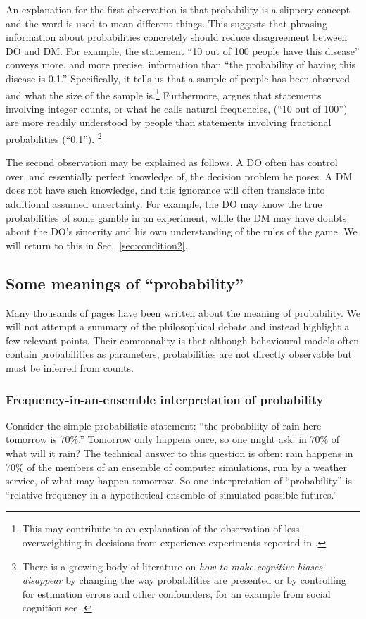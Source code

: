 \documentclass[a4paper, 12pt]{article}
\newcommand{\seclabel}[1]{\label{sec:#1}}
\newcommand{\secref}[1]{Sec.~\ref{sec:#1}}
\begin{document}
An explanation for the first observation is that probability is a slippery concept and the word is used to mean different things. This suggests that phrasing information about probabilities concretely should reduce disagreement between DO and DM. For example, the statement ``10 out of 100 people have this disease'' conveys more, and more precise, information than ``the probability of having this disease is 0.1.'' Specifically, it tells us that a sample of people has been observed and what the size of the sample is.\footnote{This may contribute to an explanation of the observation of less overweighting in decisions-from-experience experiments reported in \textcite{HertwigETAL2004,HertwigErev2009}.} Furthermore, \textcite{Gigerenzer2018} argues that statements involving integer counts, or what he calls natural frequencies,  (``10 out of 100'') are more readily understood by people than statements involving fractional probabilities (``0.1'').%
\footnote{There is a growing body of literature on \textit{how to make cognitive biases disappear} by changing the way probabilities are presented \parencite{Gigerenzer1991} or by controlling for estimation errors and other confounders, for an example from social cognition see \textcite{GalesicETAL2012}.}

The second observation may be explained as follows. A DO often has control over, and essentially perfect knowledge of, the decision problem he poses. A DM does not have such knowledge, and this ignorance will often translate into additional assumed uncertainty. For example, the DO may know the true probabilities of some gamble in an experiment, while the DM may have doubts about the DO's sincerity and his own understanding of the rules of the game. We will return to this in \secref{condition2}.

\subsection{Some meanings of ``probability'' \seclabel{tricky}}
Many thousands of pages have been written about the meaning of probability. We will not attempt a summary of the philosophical debate and instead highlight a few relevant points. Their commonality is that although behavioural models often contain probabilities as parameters, probabilities are not directly observable but must be inferred from counts.

\subsubsection*{Frequency-in-an-ensemble interpretation of probability}
Consider the simple probabilistic statement: ``the probability of rain here tomorrow is 70\%.'' Tomorrow only happens once, so one might ask: in 70\% of what will it rain? The technical answer to this question is often: rain happens in 70\% of the members of an ensemble of computer simulations, run by a weather service, of what may happen tomorrow. So one interpretation of ``probability'' is ``relative frequency in a hypothetical ensemble of simulated possible futures.''
\end{document}
